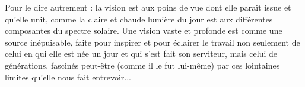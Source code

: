 Pour le dire autrement : la vision est aux poins de vue dont elle paraît issue et qu'elle unit, comme la claire et chaude lumière du jour est aux différentes composantes du spectre solaire. Une vision vaste et profonde est comme une source inépuisable, faite pour inspirer et pour éclairer le travail non seulement de celui en qui elle est née un jour et qui s'est fait son serviteur, mais celui de générations, fascinés peut-être (comme il le fut lui-même) par ces lointaines limites qu'elle nous fait entrevoir...



